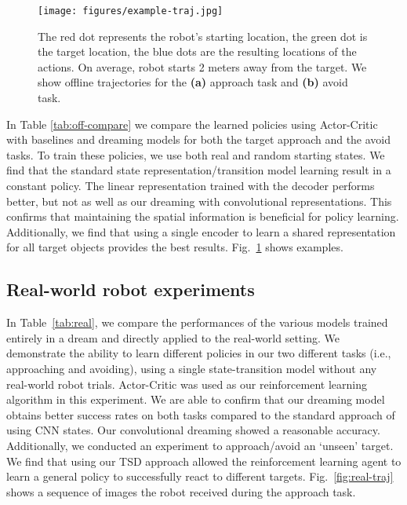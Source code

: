 \documentclass[letterpaper, 10 pt, conference]{ieeeconf}
\begin{document}
\begin{figure}
    \centering
      \texttt{[image: figures/example-traj.jpg]}
    \caption{The red dot represents the robot's starting location, the green dot is the target location, the blue dots are the resulting locations of the actions. On average, robot starts 2 meters away from the target. We show offline trajectories for the \textbf{(a)} approach task and \textbf{(b)} avoid task.}
    \label{fig:ex-traj}
\end{figure}

In Table \ref{tab:off-compare} we compare the learned policies using Actor-Critic with baselines and dreaming models for both the target approach and the avoid tasks. To train these policies, we use both real and random starting states. We find that the standard state representation/transition model learning result in a constant policy. The linear representation trained with the decoder performs better, but not as well as our dreaming with convolutional representations. This confirms that maintaining the spatial information is beneficial for policy learning. Additionally, we find that using a single encoder to learn a shared representation for all target objects provides the best results. Fig.~\ref{fig:ex-traj} shows examples.








\subsection{Real-world robot experiments}
\label{sec:real}

In Table~\ref{tab:real}, we compare the performances of the various models trained entirely in a dream and directly applied to the real-world setting. We demonstrate the ability to learn different policies in our two different tasks (i.e., approaching and avoiding), using a single state-transition model without any real-world robot trials. Actor-Critic was used as our reinforcement learning algorithm in this experiment. We are able to confirm that our dreaming model obtains better success rates on both tasks compared to the standard approach of using CNN states. Our convolutional dreaming showed a reasonable accuracy. Additionally, we conducted an experiment to approach/avoid an `unseen' target. We find that using our TSD approach allowed the reinforcement learning agent to learn a general policy to successfully react to different targets. Fig.~\ref{fig:real-traj} shows a sequence of images the robot received during the approach task.
\end{document}
